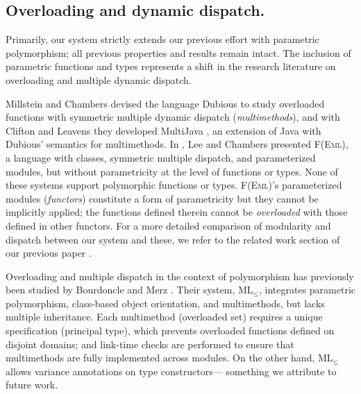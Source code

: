 %
\subsection{Overloading and dynamic dispatch.} 


Primarily, our system
strictly extends our previous effort \cite{allen07} with parametric polymorphism;
all previous properties and results remain intact. The inclusion of parametric
functions and types represents a shift in the research literature on overloading
and multiple dynamic dispatch.

Millstein and Chambers \cite{millstein02,millstein03} devised the language
Dubious to study overloaded functions with symmetric multiple dynamic dispatch
(\emph{multimethods}), and with Clifton and Leavens they developed MultiJava
\cite{multijava}, an extension of Java with Dubious' semantics for multimethods.
In \cite{feml}, Lee and Chambers presented F(E\textsc{ml}), a language with
classes, symmetric multiple dispatch, and parameterized modules, but without
parametricity at the level of functions or types. None of these systems support
polymorphic functions or types. F(E\textsc{ml})'s parameterized modules
(\emph{functors}) constitute a form of parametricity but they cannot be implicitly
applied; the functions defined therein cannot be \emph{overloaded} with those
defined in other functors. For a more detailed comparison of modularity and
dispatch between our system and these, we refer to the related work section of
our previous paper \cite{allen07}.

Overloading and multiple dispatch in the context of polymorphism 
has previously been studied by Bourdoncle and Merz \cite{bourdoncle97}. 
Their system, ML$_\le$, integrates parametric polymorphism, 
class-based object orientation, and multimethods,
but lacks multiple inheritance. 
Each multimethod (overloaded set) requires a unique specification (principal type), 
which prevents overloaded functions defined on disjoint domains; 
and link-time checks are performed to ensure that multimethods are fully
implemented across modules. 
On the other hand, ML$_\le$ allows variance annotations on type constructors---%
something we attribute to future work.

